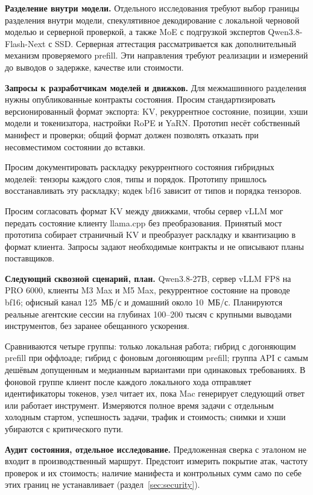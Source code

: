 \textbf{Разделение внутри модели.} Отдельного исследования требуют выбор границы разделения
внутри модели, спекулятивное декодирование с локальной черновой моделью и серверной проверкой,
а также MoE с подгрузкой экспертов Qwen3.8-Flash-Next с SSD. Серверная аттестация рассматривается
как дополнительный механизм проверяемого prefill. Эти направления требуют реализации
и измерений до выводов о задержке, качестве или стоимости.

\textbf{Запросы к разработчикам моделей и движков.} Для межмашинного разделения нужны опубликованные контракты состояния.
Просим стандартизировать версионированный формат экспорта: KV, рекуррентное состояние, позиции,
хэши модели и токенизатора, настройки RoPE и YaRN. Прототип несёт собственный манифест и проверки;
общий формат должен позволять отказать при несовместимом состоянии до вставки.

Просим документировать раскладку рекуррентного состояния гибридных моделей: тензоры каждого слоя, типы и порядок.
Прототипу пришлось восстанавливать эту раскладку; кодек bf16 зависит от типов и порядка тензоров.

Просим согласовать формат KV между движками, чтобы сервер vLLM мог передать состояние клиенту llama.cpp
без преобразования. Принятый мост прототипа собирает страничный KV и преобразует раскладку и квантизацию в формат клиента.
Запросы задают необходимые контракты и не описывают планы поставщиков.


\textbf{Следующий сквозной сценарий, план.} Qwen3.8-27B, сервер vLLM FP8 на PRO 6000,
клиенты M3 Max и M5 Max, рекуррентное состояние на проводе bf16; офисный канал 125~МБ/с
и домашний около 10~МБ/с. Планируются реальные агентские сессии на глубинах 100--200 тысяч
с крупными выводами инструментов, без заранее обещанного ускорения.

Сравниваются четыре группы: только локальная работа; гибрид с догоняющим prefill при оффлоаде;
гибрид с фоновым догоняющим prefill; группа API с самым дешёвым допущенным и медианным вариантами
при одинаковых требованиях. В фоновой группе клиент после каждого локального хода отправляет идентификаторы токенов,
узел читает их, пока Mac генерирует следующий ответ или работает инструмент.
Измеряются полное время задачи с отдельным холодным стартом, успешность задачи, трафик и стоимость;
снимки и хэши убираются с критического пути.

\textbf{Аудит состояния, отдельное исследование.} Предложенная сверка с эталоном не входит в производственный маршрут.
Предстоит измерить покрытие атак, частоту проверок и их стоимость; наличие манифеста и контрольных сумм
само по себе этих границ не устанавливает (раздел~\ref{sec:security}).

